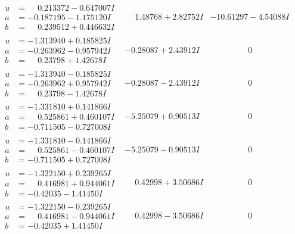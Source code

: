 \documentclass[1p]{elsarticle_modified}
\theoremstyle{definition}
\begin{document}
$$\begin{array}{c|c|c}
\begin{aligned}
u &= \phantom{-}0.213372 - 0.647007 I \\
a &= -0.187195 - 1.175120 I \\
b &= \phantom{-}0.239512 + 0.446632 I\end{aligned}
 & \phantom{-}1.48768 + 2.82752 I & -10.61297 - 4.54088 I \\ \hline\begin{aligned}
u &= -1.313940 + 0.185825 I \\
a &= -0.263962 - 0.957942 I \\
b &= \phantom{-}0.23798 + 1.42678 I\end{aligned}
 & -0.28087 + 2.43912 I & \phantom{-0.000000 } 0 \\ \hline\begin{aligned}
u &= -1.313940 - 0.185825 I \\
a &= -0.263962 + 0.957942 I \\
b &= \phantom{-}0.23798 - 1.42678 I\end{aligned}
 & -0.28087 - 2.43912 I & \phantom{-0.000000 } 0 \\ \hline\begin{aligned}
u &= -1.331810 + 0.141866 I \\
a &= \phantom{-}0.525861 + 0.460107 I \\
b &= -0.711505 - 0.727008 I\end{aligned}
 & -5.25079 + 0.90513 I & \phantom{-0.000000 } 0 \\ \hline\begin{aligned}
u &= -1.331810 - 0.141866 I \\
a &= \phantom{-}0.525861 - 0.460107 I \\
b &= -0.711505 + 0.727008 I\end{aligned}
 & -5.25079 - 0.90513 I & \phantom{-0.000000 } 0 \\ \hline\begin{aligned}
u &= -1.322150 + 0.239265 I \\
a &= \phantom{-}0.416981 + 0.944061 I \\
b &= -0.42035 - 1.41450 I\end{aligned}
 & \phantom{-}0.42998 + 3.50686 I & \phantom{-0.000000 } 0 \\ \hline\begin{aligned}
u &= -1.322150 - 0.239265 I \\
a &= \phantom{-}0.416981 - 0.944061 I \\
b &= -0.42035 + 1.41450 I\end{aligned}
 & \phantom{-}0.42998 - 3.50686 I & \phantom{-0.000000 } 0 \\ \hline\begin{aligned}

\end{aligned}
\end{array}$$
\end{document}
